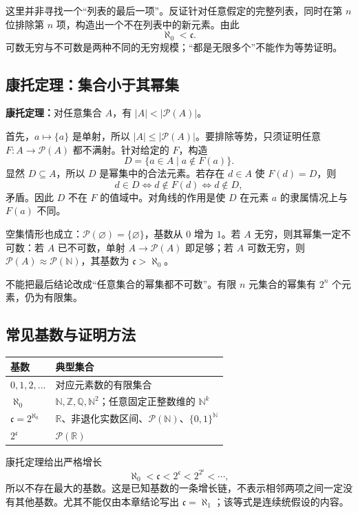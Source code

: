 \documentclass[UTF8,fontset=none,zihao=-4,a4paper]{ctexart}
\newcommand{\term}[1]{\textbf{#1}}
\begin{document}
这里并非寻找一个“列表的最后一项”。反证针对任意假定的完整列表，同时在第 $n$ 位排除第 $n$ 项，构造出一个不在列表中的新元素。由此
\[
\aleph_0<\mathfrak c.
\]
可数无穷与不可数是两种不同的无穷规模；“都是无限多个”不能作为等势证明。

\subsection{康托定理：集合小于其幂集}
\term{康托定理：}对任意集合 $A$，有 $|A|<|\mathcal P(A)|$。

首先，$a\mapsto\{a\}$ 是单射，所以 $|A|\le|\mathcal P(A)|$。要排除等势，只须证明任意 $F:A\to\mathcal P(A)$ 都不满射。针对给定的 $F$，构造
\[
D=\{a\in A\mid a\notin F(a)\}.
\]
显然 $D\subseteq A$，所以 $D$ 是幂集中的合法元素。若存在 $d\in A$ 使 $F(d)=D$，则
\[
d\in D\Longleftrightarrow d\notin F(d)\Longleftrightarrow d\notin D,
\]
矛盾。因此 $D$ 不在 $F$ 的值域中。对角线的作用是使 $D$ 在元素 $a$ 的隶属情况上与 $F(a)$ 不同。

空集情形也成立：$\mathcal P(\varnothing)=\{\varnothing\}$，基数从 $0$ 增为 $1$。若 $A$ 无穷，则其幂集一定不可数：若 $A$ 已不可数，单射 $A\to\mathcal P(A)$ 即足够；若 $A$ 可数无穷，则 $\mathcal P(A)\approx\mathcal P(\mathbb N)$，其基数为 $\mathfrak c>\aleph_0$。

不能把最后结论改成“任意集合的幂集都不可数”。有限 $n$ 元集合的幂集有 $2^n$ 个元素，仍为有限集。

\subsection{常见基数与证明方法}
\begin{center}
\begin{tabularx}{\linewidth}{l Y}
\toprule 基数 & 典型集合\\\midrule
$0,1,2,\ldots$ & 对应元素数的有限集合\\
$\aleph_0$ & $\mathbb N,\mathbb Z,\mathbb Q,\mathbb N^2$；任意固定正整数维的 $\mathbb N^k$\\
$\mathfrak c=2^{\aleph_0}$ & $\mathbb R$、非退化实数区间、$\mathcal P(\mathbb N)$、$\{0,1\}^{\mathbb N}$\\
$2^{\mathfrak c}$ & $\mathcal P(\mathbb R)$\\\bottomrule
\end{tabularx}
\end{center}
康托定理给出严格增长
\[
\aleph_0<\mathfrak c<2^{\mathfrak c}<2^{2^{\mathfrak c}}<\cdots,
\]
所以不存在最大的基数。这是已知基数的一条增长链，不表示相邻两项之间一定没有其他基数。尤其不能仅由本章结论写出 $\mathfrak c=\aleph_1$；该等式是连续统假设的内容。
\end{document}
